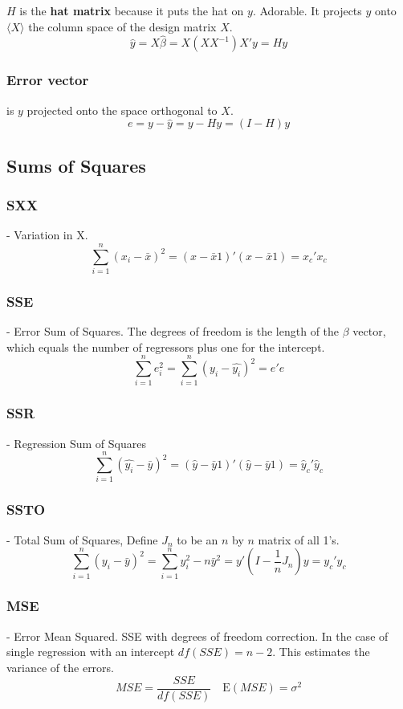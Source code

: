 \documentclass[12pt]{article}
\newcommand{\E}{\mathrm{E}}
\begin{document}
$H$ is the \textbf{hat matrix} because it puts the hat on $y$. Adorable. It projects
$y$ onto $\langle X \rangle$ the column space of the design matrix $X$.
\[
    \hat{y} = X \hat{\beta} = X(X X^{-1})X'y = Hy
\]

\subsubsection{Error vector} is $y$ projected onto the space orthogonal to $X$.
\[
    e = y - \hat{y} = y - Hy = (I - H)y
\]

\subsection{Sums of Squares}

\subsubsection{SXX} - Variation in X.
\[
    \sum_{i=1}^n (x_i - \bar{x})^2 
    = (x - \bar{x}1)' (x - \bar{x}1) 
    = x_c' x_c
\]

\subsubsection{SSE} - Error Sum of Squares. The degrees of freedom is the
length of the $\beta$ vector, which equals the number of regressors plus
one for the intercept.
\[
    \sum_{i=1}^n e_i^2 = \sum_{i=1}^n (y_i - \hat{y_i})^2
    = e'e
\]

\subsubsection{SSR} - Regression Sum of Squares
\[
    \sum_{i=1}^n (\hat{y_i} - \bar{y})^2
    = (\hat{y} - \bar{y} 1)' (\hat{y} - \bar{y} 1) 
    = \hat{y}_c' \hat{y}_c
\]

\subsubsection{SSTO} - Total Sum of Squares, Define $J_n$ to be an $n$ by $n$ matrix of all 1's.
\[
    \sum_{i=1}^n (y_i - \bar{y})^2 = \sum_{i=1}^n y_i^2 - n\bar{y}^2
    = y'(I - \frac{1}{n} J_n)y
    = y_c' y_c
\]

\subsubsection{MSE} - Error Mean Squared. SSE with degrees of freedom correction. In the
case of single regression with an intercept $df(SSE) = n-2$. This estimates
the variance of the errors.
\[
    MSE = \frac{SSE}{df(SSE)} \quad \E(MSE) = \sigma^2
\]
\end{document}
